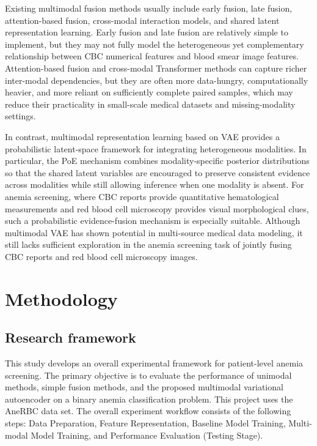 \documentclass[conference]{IEEEtran}
\begin{document}
Existing multimodal fusion methods usually include early fusion, late fusion, attention-based fusion, cross-modal interaction models, and shared latent representation learning. Early fusion and late fusion are relatively simple to implement, but they may not fully model the heterogeneous yet complementary relationship between CBC numerical features and blood smear image features. Attention-based fusion and cross-modal Transformer methods can capture richer inter-modal dependencies, but they are often more data-hungry, computationally heavier, and more reliant on sufficiently complete paired samples, which may reduce their practicality in small-scale medical datasets and missing-modality settings.

In contrast, multimodal representation learning based on VAE provides a probabilistic latent-space framework for integrating heterogeneous modalities. In particular, the PoE mechanism combines modality-specific posterior distributions so that the shared latent variables are encouraged to preserve consistent evidence across modalities while still allowing inference when one modality is absent. For anemia screening, where CBC reports provide quantitative hematological measurements and red blood cell microscopy provides visual morphological clues, such a probabilistic evidence-fusion mechanism is especially suitable. Although multimodal VAE has shown potential in multi-source medical data modeling, it still lacks sufficient exploration in the anemia screening task of jointly fusing CBC reports and red blood cell microscopy images.

\section{Methodology}

\subsection{Research framework}

This study develops an overall experimental framework for patient-level anemia screening. The primary objective is to evaluate the performance of unimodal methods, simple fusion methods, and the proposed multimodal variational autoencoder on a binary anemia classification problem. This project uses the AneRBC data set. The overall experiment workflow consists of the following steps: Data Preparation, Feature Representation, Baseline Model Training, Multi-modal Model Training, and Performance Evaluation (Testing Stage).
\end{document}
